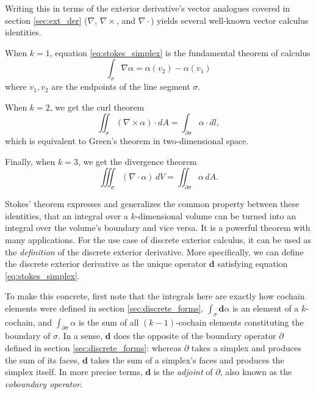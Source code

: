 \documentclass[utf8,english]{gradu3}
\begin{document}
Writing this in terms of the exterior derivative's
vector analogues covered in section \ref{sec:ext_der}
($\nabla$, $\nabla \times$, and $\nabla \cdot$)
yields several well-known vector calculus identities.

When $k = 1$, equation \ref{eq:stokes_simplex}
is the fundamental theorem of calculus
\begin{equation}\label{eq:fund_theorem_calc}
  \int_{\sigma} \nabla \alpha = \alpha(v_2) - \alpha(v_1)
\end{equation}
where $v_1,v_2$ are the endpoints of the line segment $\sigma$.

When $k = 2$, we get the curl theorem
\begin{equation}\label{eq:curl_theorem}
  \iint_{\sigma} (\nabla \times \alpha) \cdot dA = \int_{\partial\sigma} \alpha \cdot dl,
\end{equation}
which is equivalent to Green's theorem in two-dimensional space.

Finally, when $k = 3$, we get the divergence theorem
\begin{equation}\label{eq:divergence_theorem}
  \iiint_{\sigma} (\nabla \cdot \alpha) \,dV = \iint_{\partial\sigma} \alpha \,dA.
\end{equation}

Stokes' theorem expresses and generalizes the common property between these identities,
that an integral over a $k$-dimensional volume
can be turned into an integral over the volume's boundary and vice versa.
It is a powerful theorem with many applications.
For the use case of discrete exterior calculus,
it can be used as the \textit{definition} of
the discrete exterior derivative.
More specifically, we can define the discrete exterior derivative
as the unique operator $\mathbf{d}$ satisfying equation \ref{eq:stokes_simplex}.

To make this concrete, first note that the integrals here
are exactly how cochain elements were defined in section \ref{sec:discrete_forms}.
$\int_{\sigma} \mathbf{d}\alpha$ is an element of a $k$-cochain,
and $\int_{\partial\sigma} \alpha$ is the sum of all $(k-1)$-cochain elements
constituting the boundary of $\sigma$.
In a sense, $\mathbf{d}$ does the opposite of the boundary operator $\partial$
defined in section \ref{sec:discrete_forms}:
whereas $\partial$ takes a simplex and produces the sum of its faces,
$\mathbf{d}$ takes the sum of a simplex's faces and produces the simplex itself.
In more precise terms, $\mathbf{d}$ is the \textit{adjoint} of $\partial$,
also known as the \textit{coboundary operator}.
\end{document}
